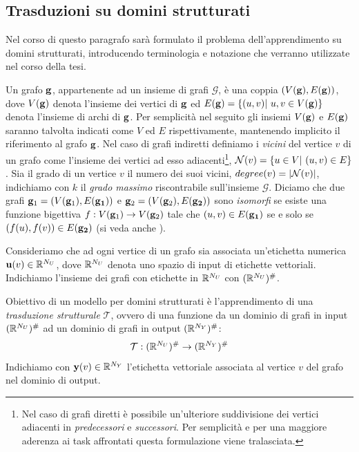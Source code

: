 \subsection{Trasduzioni su domini strutturati}\label{sec:intro:struct:terminologia}
Nel corso di questo paragrafo sarà formulato il problema dell'apprendimento su domini strutturati, introducendo terminologia e notazione che verranno utilizzate nel corso della tesi.

Un grafo $\mathbf{g}$, appartenente ad un insieme di grafi $\mathcal{G}$, è una coppia $(V(\mathbf{g}), E(\mathbf{g}))$, dove $V(\mathbf{g})$ denota l'insieme dei vertici di $\mathbf{g}$ ed $E(\mathbf{g}) = \lbrace (u,v) \vert\ u, v \in V(\mathbf{g}) \rbrace$ denota l'insieme di archi di $\mathbf{g}$. Per semplicità nel seguito gli insiemi $V(\mathbf{g})$ e $E(\mathbf{g})$ saranno talvolta indicati come $V$ ed $E$ rispettivamente, mantenendo implicito il riferimento al grafo $\mathbf{g}$. Nel caso di grafi indiretti definiamo i \emph{vicini} del vertice $v$ di un grafo come l'insieme dei vertici ad esso adiacenti\footnote{Nel caso di grafi diretti è possibile un'ulteriore suddivisione dei vertici adiacenti in \emph{predecessori} e \emph{successori}. Per semplicità e per una maggiore aderenza ai task affrontati questa formulazione viene tralasciata.}, $\mathcal{N}(v) = \lbrace u \in V \vert\ (u,v) \in E \rbrace$. Sia il grado di un vertice $v$ il numero dei suoi vicini, $degree(v) = \lvert\mathcal{N}(v)\rvert$, indichiamo con $k$ il \emph{grado massimo} riscontrabile sull'insieme $\mathcal{G}$.
Diciamo che due grafi $\mathbf{g}_1 = (V(\mathbf{g}_1), E(\mathbf{g_1}))$ e $\mathbf{g}_2 = (V(\mathbf{g}_2), E(\mathbf{g_2}))$ sono \emph{isomorfi} se esiste una funzione bigettiva $f : V(\mathbf{g}_1) \rightarrow V(\mathbf{g}_2)$ tale che $(u,v) \in E(\mathbf{g_1})$ se e solo se $(f(u), f(v)) \in E(\mathbf{g_2})$ (si veda anche \cite{Hammer:AdaptiveContextualProcessing}). 

Consideriamo che ad ogni vertice di un grafo sia associata un'etichetta numerica $\mathbf{u}(v) \in \mathbb{R}^{N_U}$, dove $\mathbb{R}^{N_U}$ denota uno spazio di input di etichette vettoriali. Indichiamo l'insieme dei grafi con etichette in $\mathbb{R}^{N_U}$ con $(\mathbb{R}^{N_U})^{\#}$.

Obiettivo di un modello per domini strutturati è l'apprendimento di una \emph{trasduzione strutturale} $\mathcal{T}$, ovvero di una funzione da un dominio di grafi in input $(\mathbb{R}^{N_U})^{\#}$ ad un dominio di grafi in output $(\mathbb{R}^{N_Y})^{\#}$:
\begin{equation}\label{eq:transduction}
\mathcal{T} : (\mathbb{R}^{N_U})^{\#} \rightarrow (\mathbb{R}^{N_Y})^{\#}
\end{equation}
Indichiamo con $\mathbf{y}(v) \in \mathbb{R}^{N_Y}$ l'etichetta vettoriale associata al vertice $v$ del grafo nel dominio di output. 

